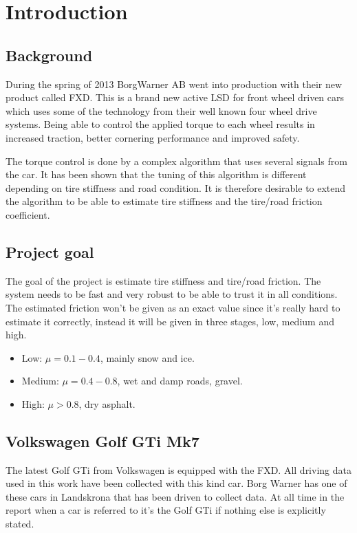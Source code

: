 \chapter{Introduction}

\section{Background}
During the spring of 2013 BorgWarner AB went into production with their new product called FXD. This is a brand new active LSD for front wheel driven cars which uses some of the technology from their well known four wheel drive systems. Being able to control the applied torque to each wheel results in increased traction, better cornering performance and improved safety.

The torque control is done by a complex algorithm that uses several signals from the car. It has been shown that the tuning of this algorithm is different depending on tire stiffness and road condition. It is therefore desirable to extend the algorithm to be able to estimate tire stiffness and the tire/road friction coefficient.


\section{Project goal}
The goal of the project is estimate tire stiffness and tire/road friction. The system needs to be fast and very robust to be able to trust it in all conditions. The estimated friction won't be given as an exact value since it's really hard to estimate it correctly, instead it will be given in three stages, low, medium and high.

\begin{itemize}
	\item Low: $ \mu = 0.1-0.4 $, mainly snow and ice.
	\item Medium: $ \mu = 0.4-0.8 $, wet and damp roads, gravel.
	\item High: $ \mu > 0.8 $, dry asphalt.
\end{itemize}

\section{Volkswagen Golf GTi Mk7}
The latest Golf GTi from Volkswagen is equipped with the FXD. All driving data used in this work have been collected with this kind car. Borg Warner has one of these cars in Landskrona that has been driven to collect data. At all time in the report when a car is referred to it's the Golf GTi if nothing else is explicitly stated.

